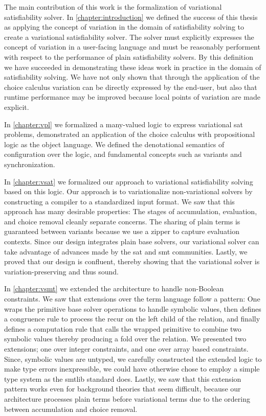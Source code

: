 \label{section:conclusion:cont-summary}

The main contribution of this work is the formalization of variational
satisfiability solver. In \autoref{chapter:introduction} we defined the success
of this thesis as applying the concept of variation in the domain of
satisfiability solving to create a variational satisfiability solver. The solver
must explicitly expresses the concept of variation in a user-facing language and
must be reasonably performent with respect to the performance of plain
satisfiability solvers. By this definition we have succeeded in demonstrating
these ideas work in practice in the domain of satisfiability solving. We have
not only shown that through the application of the choice calculus variation can
be directly expressed by the end-user, but also that runtime performance may be
improved because local points of variation are made explicit.

In \autoref{chapter:vpl} we formalized a many-valued logic to express
variational \ac{sat} problems, demonstrated an application of the choice
calculus with propositional logic as the object language. We defined the
denotational semantics of configuration over the logic, and fundamental concepts
such as variants and synchronization.

In \autoref{chapter:vsat} we formalized our approach to variational
satisfiability solving based on this logic. Our approach is to variationalize
non-variational solvers by constructing a compiler to a standardized input
format. We saw that this approach has many desirable properties: The stages of
accumulation, evaluation, and choice removal cleanly separate concerns. The
sharing of plain terms is guaranteed between variants because we use a zipper to
capture evaluation contexts. Since our design integrates plain base solvers, our
variational solver can take advantage of advances made by the \ac{sat} and
\ac{smt} communities. Lastly, we proved that our design is confluent, thereby
showing that the variational solver is variation-preserving and thus sound.

In \autoref{chapter:vsmt} we extended the architecture to handle non-Boolean
constraints. We saw that extensions over the term language follow a pattern: One
wraps the primitive base solver operations to handle symbolic values, then
defines a congruence rule to process the recur on the left child of the
relation, and finally defines a computation rule that calls the wrapped
primitive to combine two symbolic values thereby producing a fold over the
relation. We presented two extensions; one over integer constraints, and one
over array based constraints. Since, symbolic values are untyped, we carefully
constructed the extended logic to make type errors inexpressible, we could have
otherwise chose to employ a simple type system as the \acl{smtlib} standard
does. Lastly, we saw that this extension pattern works even for background
theories that seem difficult, because our architecture processes plain terms
before variational terms due to the ordering between accumulation and choice
removal.

